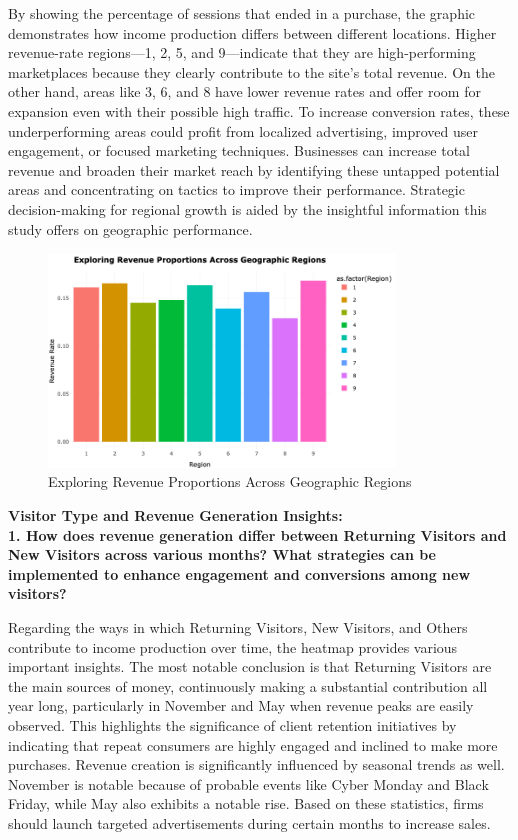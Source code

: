 \documentclass[12pt]{article}
\begin{document}
By showing the percentage of sessions that ended in a purchase, the graphic demonstrates how income production differs between different locations. Higher revenue-rate regions—1, 2, 5, and 9—indicate that they are high-performing marketplaces because they clearly contribute to the site's total revenue. On the other hand, areas like 3, 6, and 8 have lower revenue rates and offer room for expansion even with their possible high traffic. To increase conversion rates, these underperforming areas could profit from localized advertising, improved user engagement, or focused marketing techniques. Businesses can increase total revenue and broaden their market reach by identifying these untapped potential areas and concentrating on tactics to improve their performance. Strategic decision-making for regional growth is aided by the insightful information this study offers on geographic performance.
\begin{figure}[h]
    \centering
    \includegraphics[width=0.82\textwidth]{Exploring Revenue Proportions Across Geographic Regions.png}  
    \caption{Exploring Revenue Proportions Across Geographic Regions}
\end{figure}
\vspace{0.5cm}


\textbf{Visitor Type and Revenue Generation Insights:}\\

\textbf{1. How does revenue generation differ between Returning Visitors and New Visitors across various months? What strategies can be implemented to enhance engagement and conversions among new visitors?} \\[5pt] %

\FloatBarrier

Regarding the ways in which Returning Visitors, New Visitors, and Others contribute to income production over time, the heatmap provides various important insights. The most notable conclusion is that Returning Visitors are the main sources of money, continuously making a substantial contribution all year long, particularly in November and May when revenue peaks are easily observed. This highlights the significance of client retention initiatives by indicating that repeat consumers are highly engaged and inclined to make more purchases. Revenue creation is significantly influenced by seasonal trends as well. November is notable because of probable events like Cyber Monday and Black Friday, while May also exhibits a notable rise. Based on these statistics, firms should launch targeted advertisements during certain months to increase sales.
\end{document}
